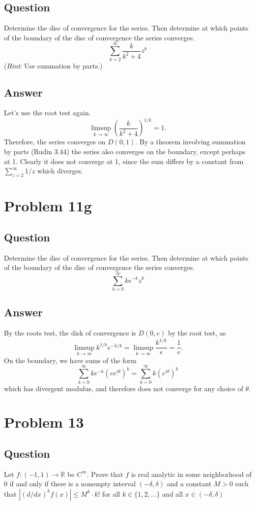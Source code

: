 \documentclass[11pt]{article}
\begin{document}
\subsection{Question}
Determine the disc of convergence for the series. Then determine at which points of the boundary of the disc of convergence the series converges.
\[\sum_{k=2}^\infty \frac{k}{k^2+4}z^k\]
(\emph{Hint}: Use summation by parts.)
\subsection{Answer}
Let's use the root test again. 
\[\limsup_{k \to \infty} \left( \frac{k}{k^2+4} \right) ^{1/k} = 1.\]
Therefore, the series converges on $D(0,1)$. By a theorem involving summation by parts (Rudin 3.44) the series also converges on the boundary, except perhaps at 1. Clearly it does not converge at 1, since the sum differs by  a constant from $\sum_{z=2}^\infty 1/z$ which diverges.

\section{Problem 11g}
\subsection{Question}
Determine the disc of convergence for the series. Then determine at which points of the boundary of the disc of convergence the series converges.
\[\sum_{k=0}^\infty ke^{-k} z^k\]
\subsection{Answer}
By the roots test, the disk of convergence is $D(0,e)$ by the root test, as
\[ \limsup_{k \to \infty} k^{1/k}e^{-k/k} = \limsup_{k \to \infty} \frac{k^{1/k}}{e} = \frac{1}{e}.\]
On the boundary, we have sums of the form
\[\sum_{k=0}^\infty k e^{-k} (e e^{i \theta})^k = \sum_{k=0}^\infty k  ( e^{i \theta})^k\]
which has divergent modulus, and therefore does not converge for any choice of $\theta$.

\section{Problem 13}
\subsection{Question}
Let $f: (-1, 1) \to \mathbb{R}$ be $C^\infty$. Prove that $f$ is real analytic in some neighborhood of 0 if and only if there is a nonempty interval $(-\delta, \delta)$ and a constant $M > 0$ such that $|(d/dx)^k f(x)|\leq M^k \cdot k!$ for all $k \in \{1,2, \dots\}$ and all $x \in (-\delta, \delta)$
\end{document}
